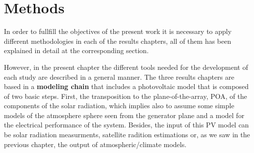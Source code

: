 
\chapter{Methods\label{cha:methods}}

In order to fullfill the objectives of the present work it is necessary to apply different methodologies in each of the results chapters, all of them has been explained in detail at the corresponding section. %

However, in the present chapter the different tools needed for the development of each study are described in a general manner. The three results chapters are based in a \textbf{modeling chain} that includes a photovoltaic model that is composed of two basic steps. First, the transposition to the plane-of-the-array, POA, of the components of the solar radiation, which implies also to assume some simple models of the atmosphere sphere seen from the generator plane and a model for the electrical performance of the system. Besides, the input of this PV model can be solar radiation measurments, satellite radition estimations or, as we saw in the previous chapter, the output of atmospheric/climate models. 


